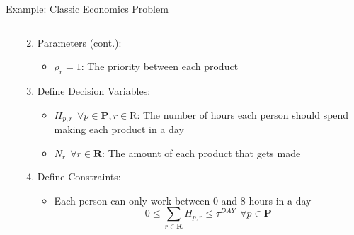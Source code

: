 \documentclass[10pt, aspectratio=169]{beamer}
\begin{document}
\begin{frame}[t]{Example: Classic Economics Problem}
\begin{columns}[t]
\begin{column}[t]{0.5\textwidth}
\begin{enumerate}
\begin{itemize}
                \end{itemize}
            \end{enumerate}
        \end{column}
        \begin{column}[t]{0.5\textwidth}
            \begin{enumerate}
                \setcounter{enumi}{1}
                \item Parameters (cont.):
                \begin{itemize}
                    \item $\rho_{r} = 1$: The priority between each product
                \end{itemize}
                \item Define Decision Variables:
                \begin{itemize}
                    \item $H_{p,r} \ \  \forall p \in \textbf{P}, r \in \text{R}$: The number of hours each person should spend making each product in a day
                    \item $N_{r} \ \ \forall r \in \textbf{R}$: The amount of each product that gets made
                \end{itemize}
                \item Define Constraints:
                \begin{itemize}
                    \item Each person can only work between 0 and 8 hours in a day
                    $$0 \leq \sum_{r \in \textbf{R}} H_{p,r} \leq \tau^{DAY} \ \ \forall p \in \textbf{P}$$
                \end{itemize}
            \end{enumerate}
        \end{column}
    \end{columns}
\end{frame}
\end{document}
